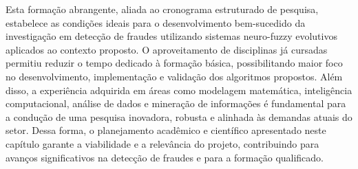 \begin{table}[h]
\centering
\caption{Disciplinas Isoladas Cursadas na UFMG}
\label{tab:disciplinas_ufmg}
\end{table}


Esta formação abrangente, aliada ao cronograma estruturado de pesquisa, estabelece as condições ideais para o desenvolvimento bem-sucedido da investigação em detecção de fraudes utilizando sistemas neuro-fuzzy evolutivos aplicados ao contexto proposto. O aproveitamento de disciplinas já cursadas permitiu reduzir o tempo dedicado à formação básica, possibilitando maior foco no desenvolvimento, implementação e validação dos algoritmos propostos. Além disso, a experiência adquirida em áreas como modelagem matemática, inteligência computacional, análise de dados e mineração de informações é fundamental para a condução de uma pesquisa inovadora, robusta e alinhada às demandas atuais do setor. Dessa forma, o planejamento acadêmico e científico apresentado neste capítulo garante a viabilidade e a relevância do projeto, contribuindo para avanços significativos na detecção de fraudes e para a formação qualificado.
